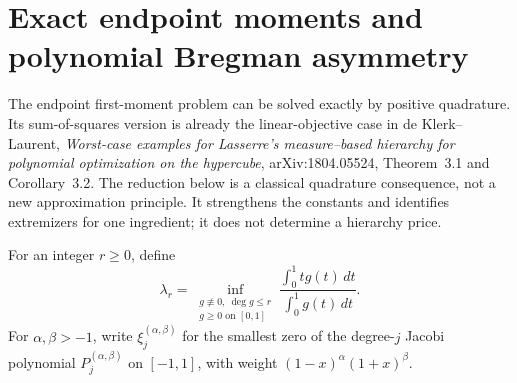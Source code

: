 \section{Exact endpoint moments and polynomial Bregman asymmetry}
\label{sec:p9-exact-asymmetry}

The endpoint first-moment problem can be solved exactly by positive
quadrature. Its sum-of-squares version is already the linear-objective
case in de Klerk--Laurent, \emph{Worst-case examples for Lasserre's
measure--based hierarchy for polynomial optimization on the hypercube},
arXiv:1804.05524, Theorem~3.1 and Corollary~3.2. The reduction below is a
classical quadrature consequence, not a new approximation principle.
It strengthens the constants and identifies extremizers for one ingredient;
it does not determine a hierarchy price.

For an integer $r\ge0$, define
\[
 \lambda_r=\inf_{\substack{g\not\equiv0,\ \deg g\le r\\
                                      g\ge0\text{ on }[0,1]}}
       \frac{\int_0^1 t g(t)\,dt}{\int_0^1g(t)\,dt}.
\]
For $\alpha,\beta>-1$, write $\xi_j^{(\alpha,\beta)}$ for the
smallest zero of the degree-$j$ Jacobi polynomial
$P_j^{(\alpha,\beta)}$ on $[-1,1]$, with weight
$(1-x)^\alpha(1+x)^\beta$.

